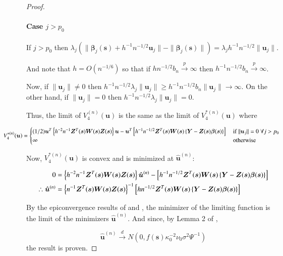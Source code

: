 \documentclass[authoryear, review, 11pt]{elsarticle}
\begin{document}
\begin{proof}
        \paragraph{Case $j > p_0$}
        If $j > p_0$ then $\lambda_j \left( \|\bm{\beta}_j(\bm{s}) + h^{-1} n^{-1/2} \bm{u}_j \| - \| \bm{\beta}_j(\bm{s}) \| \right) = \lambda_j h^{-1} n^{-1/2} \| \bm{u}_j \| $. 
        
        And note that $h = O(n^{-1/6})$ so that if $h n^{-1/2} b_n \xrightarrow{p} \infty$ then $h^{-1} n^{-1/2} b_n \xrightarrow{p} \infty$.
        
         Now, if $\| \bm{u}_j \| \ne 0$ then $h^{-1} n^{-1/2} \lambda_j \| \bm{u}_j \| \ge h^{-1} n^{-1/2} b_n \| \bm{u}_j \| \to \infty$. On the other hand, if $\| \bm{u}_j \| = 0$ then $h^{-1} n^{-1/2} \lambda_j \| \bm{u}_j \| = 0$.

        Thus, the limit of $V_4^{(n)} (\bm{u})$ is the same as the limit of $V_4^{*(n)} (\bm{u})$ where

        \begin{equation*}
            \mkern-72muV_4^{*(n)} (\bm{u}) = \begin{cases}(1/2) \bm{u}^T \left\{ h^{-2} n^{-1} \bm{Z}^T(\bm{s}) \bm{W}(\bm{s}) \bm{Z}(\bm{s}) \right\} \bm{u} - \bm{u}^T \left[ h^{-1} n^{-1/2} \bm{Z}^T(\bm{s}) \bm{W}(\bm{s}) \left\{ \bm{Y} - \bm{Z}(\bm{s}) \bm{\beta}(\bm{s}) \right\} \right] &\mbox{ if } \| \bm{u}_j \| = 0 \; \forall j > p_0 \\ \infty &\mbox{ otherwise } \end{cases}
        \end{equation*}


        Now, $V_4^{*(n)}(\bm{u})$ is convex and is minimized at $\hat{\bm{u}}^{(n)}$:

        \begin{align} \label{eq:limit}
            0 &=  \left\{ h^{-2} n^{-1} \bm{Z}^T(\bm{s}) \bm{W}(\bm{s}) \bm{Z}(\bm{s}) \right\} \hat{\bm{u}}^{(n)} - \left[ h^{-1} n^{-1/2} \bm{Z}^T(\bm{s}) \bm{W}(\bm{s}) \left\{ \bm{Y} - \bm{Z}(\bm{s}) \bm{\beta}(\bm{s}) \right\} \right] \notag \\
            \therefore \hat{\bm{u}}^{(n)} &= \left\{ n^{-1} \bm{Z}^T(\bm{s}) \bm{W}(\bm{s}) \bm{Z}(\bm{s}) \right\}^{-1} \left[ h n^{-1/2} \bm{Z}^T(\bm{s}) \bm{W}(\bm{s}) \left\{ \bm{Y} - \bm{Z}(\bm{s}) \bm{\beta}(\bm{s}) \right\} \right] \notag \\
        \end{align}

        By the epiconvergence results of \cite{Geyer-1994} and \cite{Knight-Fu-2000}, the minimizer of the limiting function is the limit of the minimizers $\hat{\bm{u}}^{(n)}$. And since, by Lemma 2 of \cite{Sun-Yan-Zhang-Lu-2014}, 

        \begin{equation}
            \hat{\bm{u}}^{(n)} \xrightarrow{d} N \left(0, f(\bm{s}) \kappa_0^{-2} \nu_0 \sigma^2 \Psi^{-1} \right)
        \end{equation}
        the result is proven.
            
    \end{proof}
\end{document}
